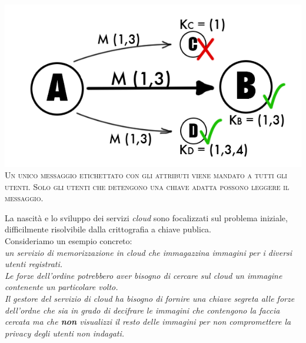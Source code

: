 \begin{center}
\begin{minipage}[c]{0.9\textwidth}
		\centering
		\includegraphics[keepaspectratio,width=\textwidth]{pairing.png}\\
		{\small\scshape Un unico messaggio etichettato con gli attributi viene mandato a tutti gli utenti. Solo gli utenti che detengono una chiave adatta possono leggere il messaggio.}
\end{minipage}
\end{center}

\newpage

La nascità e lo sviluppo dei servizi \emph{cloud} sono focalizzati sul problema iniziale, difficilmente risolvibile dalla crittografia a chiave publica.\\
Consideriamo un esempio concreto: \\
{\itshape un servizio di memorizzazione in cloud che immagazzina immagini per i diversi utenti registrati.\\
Le forze dell'ordine potrebbero aver bisogno di cercare sul cloud un immagine contenente un particolare volto.\\
Il gestore del servizio di cloud ha bisogno di fornire una chiave segreta alle forze dell'ordne che sia in grado di decifrare le immagini che contengono la faccia cercata ma che \textbf{non} visualizzi il resto delle immagini per non compromettere la privacy degli utenti non indagati.}\\[0.1cm]


